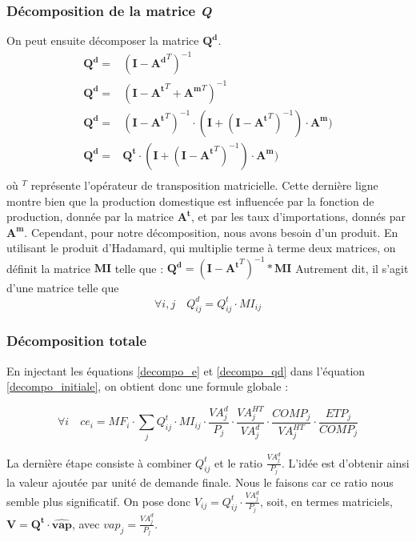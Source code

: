 \subsubsection{Décomposition de la matrice \textit{\textbf{Q}}}
On peut ensuite décomposer la matrice $\pmb{Q^d}$.
\begin{align*}
\pmb{Q^d} =& (\pmb{I} - \pmb{A^d}^T)^{-1}  \\
\pmb{Q^d} =& (\pmb{I} - \pmb{A^t}^T + \pmb{A^m}^T)^{-1}  \\
\pmb{Q^d} =& (\pmb{I} - \pmb{A^t}^T)^{-1} \cdot (\pmb{I} + (\pmb{I} - \pmb{A^t}^T)^{-1}) \cdot \pmb{A^m})  \\
\pmb{Q^d} =& \pmb{Q^t}  \cdot (\pmb{I} + (\pmb{I} - \pmb{A^t}^T)^{-1}) \cdot \pmb{A^m})  \\
\end{align*}
où $^T$ représente l'opérateur de transposition matricielle. 
Cette dernière ligne montre bien que la production domestique est influencée par la fonction de production, donnée par la matrice $\pmb{A^t}$,
et par les taux d'importations, donnés par $\pmb{A^m}$. Cependant, pour notre décomposition, nous avons besoin d'un produit. En utilisant le produit d'Hadamard, qui multiplie terme à terme deux matrices, on définit la matrice 
$\pmb{MI}$ telle que : $\pmb{Q^d} =(\pmb{I} - \pmb{A^t}^T)^{-1} * \pmb{MI}$
Autrement dit, il s'agit d'une matrice telle que 
\begin{equation}
\forall i,j \quad Q^d_{ij} = Q^t_{ij} \cdot MI_{ij} 
\label{decompo_qd}
\end{equation} 

\subsubsection{Décomposition totale}
En injectant les équations \ref{decompo_e} et \ref{decompo_qd} dans l'équation \ref{decompo_initiale}, on obtient donc une formule globale : 

\begin{equation}
\forall i \quad ce_i = MF_i \cdot \sum_j  Q^t_{ij} \cdot MI_{ij} \cdot \frac{VA^d_j}{P_j} \cdot \frac{VA^{HT}_j}{VA^d_j} \cdot \frac{COMP_j}{VA^{HT}_j} \cdot \frac{ETP_j}{COMP_j}
\end{equation}

La dernière étape consiste à combiner $Q^t_{ij}$ et le ratio $\frac{VA^d_j}{P_j}$. L'idée est d'obtenir ainsi la valeur ajoutée par unité de demande finale. Nous le faisons car ce ratio nous semble plus significatif. On pose donc $V_{ij} = Q^t_{ij} \cdot \frac{VA^d_j}{P_j}$, soit, en termes matriciels, $\pmb{V} = \pmb{Q^t} \cdot \widehat{\pmb{vap}}$, avec $vap_j = \frac{VA^d_j}{P_j}$.


